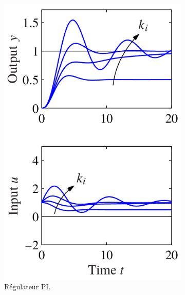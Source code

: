 \begin{figure}
\begin{subfigure}{0.3\linewidth}
    \includegraphics[width=\linewidth]{pi.png}
    \caption{Régulateur PI\cite{astrom2010feedback}.}
    \label{fig:pi}
  \end{subfigure}
  \begin{subfigure}{0.3\linewidth}

\end{subfigure}
\end{figure}
